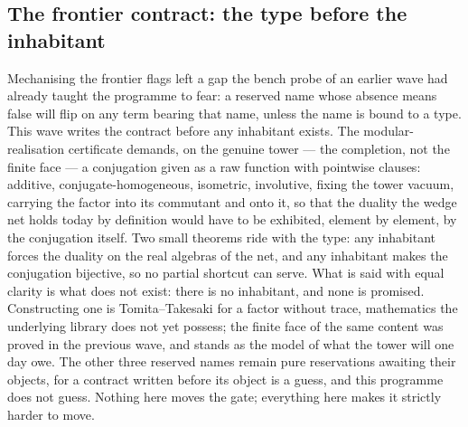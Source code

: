 \documentclass[11pt]{article}
\theoremstyle{definition}\newtheorem{deriv}{Derivation}
\begin{document}
\subsection*{The frontier contract: the type before the inhabitant}Mechanising the frontier flags left a gap the bench probe of an earlier wave had already taught the programme to fear: a reserved name whose absence means false will flip on any term bearing that name, unless the name is bound to a type. This wave writes the contract before any inhabitant exists. The modular-realisation certificate demands, on the genuine tower --- the completion, not the finite face --- a conjugation given as a raw function with pointwise clauses: additive, conjugate-homogeneous, isometric, involutive, fixing the tower vacuum, carrying the factor into its commutant and onto it, so that the duality the wedge net holds today by definition would have to be exhibited, element by element, by the conjugation itself. Two small theorems ride with the type: any inhabitant forces the duality on the real algebras of the net, and any inhabitant makes the conjugation bijective, so no partial shortcut can serve. What is said with equal clarity is what does not exist: there is no inhabitant, and none is promised. Constructing one is Tomita--Takesaki for a factor without trace, mathematics the underlying library does not yet possess; the finite face of the same content was proved in the previous wave, and stands as the model of what the tower will one day owe. The other three reserved names remain pure reservations awaiting their objects, for a contract written before its object is a guess, and this programme does not guess. Nothing here moves the gate; everything here makes it strictly harder to move.
\end{document}
